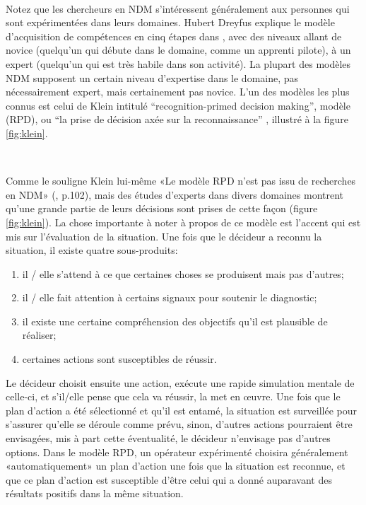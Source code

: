 ~\par
Notez que les chercheurs en NDM s'intéressent généralement aux personnes qui sont expérimentées dans leurs domaines. Hubert Dreyfus explique le modèle d’acquisition de compétences en cinq étapes dans \parencite{dreyfus2014intuitive}, avec des niveaux allant de novice (quelqu'un qui débute dans  le domaine, comme un apprenti pilote), à un expert (quelqu'un qui est très habile dans son activité). La plupart des modèles NDM supposent un certain niveau d'expertise dans le domaine, pas nécessairement expert, mais certainement pas novice. L’un des modèles les plus connus est celui de Klein intitulé  “recognition-primed decision making”, modèle (RPD), ou “la prise de décision axée sur la reconnaissance” \parencite{klein2017sources}, illustré à la figure \ref{fig:klein}.

~\par 
Comme le souligne Klein lui-même «Le modèle RPD n'est pas issu de recherches en NDM» (\parencite{klein2017sources}, p.102), mais des études d’experts dans divers domaines montrent qu’une grande partie de leurs décisions sont prises de cette façon (figure \ref{fig:klein}). La chose importante à noter à propos de ce modèle est l'accent qui est mis sur l'évaluation de la situation. Une fois que le décideur a reconnu la situation, il existe quatre sous-produits:

\begin{enumerate}

\item il / elle s'attend à ce que certaines choses se produisent mais pas d'autres;
\item il / elle fait attention à certains signaux pour soutenir le diagnostic;
\item il existe une certaine compréhension des objectifs qu'il est plausible de réaliser;
\item certaines actions sont susceptibles de réussir.
\end{enumerate}

Le décideur choisit ensuite une action, exécute une rapide simulation mentale de
celle-ci, et s'il/elle pense que cela va réussir, la met en œuvre. Une fois que le plan d’action  a été sélectionné et qu’il est entamé, la situation est surveillée pour s’assurer qu’elle se déroule comme prévu, sinon, d’autres actions pourraient être envisagées, mis à part cette éventualité, le décideur n'envisage pas d'autres options. Dans le modèle RPD, un opérateur expérimenté
choisira généralement «automatiquement» un plan d’action une fois que la situation est
reconnue, et que ce plan d’action est susceptible d’être celui qui a donné  auparavant
des résultats positifs dans la même situation.


